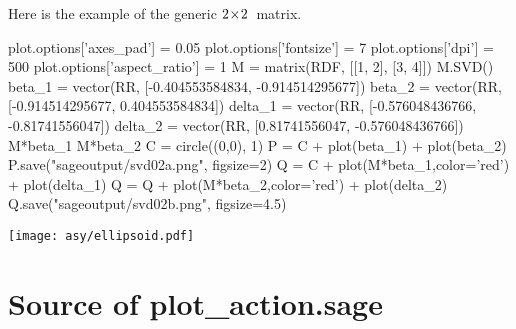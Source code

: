 Here is the example of the generic $2 \! \times \! 2$~matrix.
\begin{sageoutput}
plot.options['axes_pad'] = 0.05
plot.options['fontsize'] = 7
plot.options['dpi'] = 500
plot.options['aspect_ratio'] = 1
M = matrix(RDF, [[1, 2], [3, 4]])
M.SVD()
beta_1 = vector(RR, [-0.404553584834, -0.914514295677])
beta_2 = vector(RR, [-0.914514295677, 0.404553584834])
delta_1 = vector(RR, [-0.576048436766, -0.81741556047])
delta_2 = vector(RR, [0.81741556047, -0.576048436766])
M*beta_1
M*beta_2
C = circle((0,0), 1)
P = C + plot(beta_1) + plot(beta_2)
P.save("sageoutput/svd02a.png", figsize=2)
Q = C + plot(M*beta_1,color='red') + plot(delta_1) 
Q = Q + plot(M*beta_2,color='red') + plot(delta_2)
Q.save("sageoutput/svd02b.png", figsize=4.5)
\end{sageoutput}
\begin{center}
  \qquad
\end{center}



\begin{center}
  \texttt{[image: asy/ellipsoid.pdf]}
\end{center}



\section{Source of plot\_action.sage}


\endinput


TODO:
